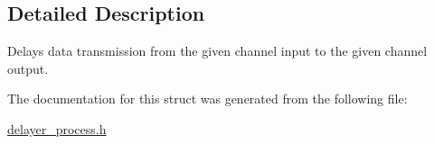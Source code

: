 \subsection{Detailed Description}
Delays data transmission from the given channel input to the given channel output. 

The documentation for this struct was generated from the following file\-:\begin{DoxyCompactItemize}
\item 
\hyperlink{delayer__process_8h}{delayer\-\_\-process.\-h}\end{DoxyCompactItemize}
